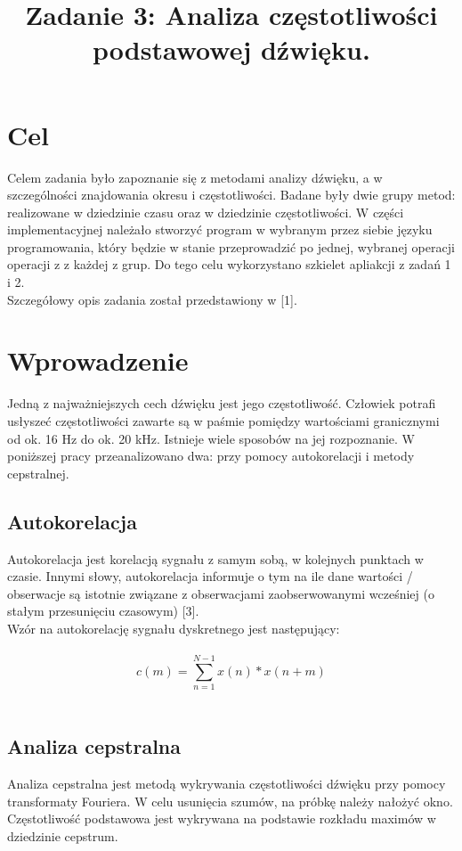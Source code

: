 \documentclass{classrep}
\author{
  \studentinfo{Jakub Antosik}{206788} \and
  \studentinfo{Andrzej Lisowski}{206807} 
}
\title{Zadanie 3: Analiza częstotliwości podstawowej dźwięku.}
\begin{document}
\maketitle

\section{Cel}
Celem zadania było zapoznanie się z metodami analizy dźwięku, a w szczególności znajdowania okresu i częstotliwości. Badane były dwie grupy metod: realizowane w dziedzinie czasu oraz w dziedzinie częstotliwości. W części implementacyjnej należało stworzyć program w wybranym przez siebie języku programowania, który będzie w stanie przeprowadzić po jednej, wybranej operacji operacji z z każdej z grup. Do tego celu wykorzystano szkielet apliakcji z zadań 1 i 2.\\
\indent
Szczegółowy opis zadania został przedstawiony w [1].

\section{Wprowadzenie}
Jedną z najważniejszych cech dźwięku jest jego częstotliwość. Człowiek potrafi usłyszeć częstotliwości zawarte są w paśmie pomiędzy wartościami granicznymi od ok. 16 Hz do ok. 20 kHz. Istnieje wiele sposobów na jej rozpoznanie. W poniższej pracy przeanalizowano dwa: przy pomocy autokorelacji i metody cepstralnej.
 
\subsection{Autokorelacja}
Autokorelacja jest korelacją sygnału z samym sobą, w kolejnych punktach w czasie. Innymi słowy, autokorelacja informuje o tym na ile dane wartości / obserwacje są istotnie związane z obserwacjami zaobserwowanymi wcześniej (o stałym przesunięciu czasowym) [3].\\
\indent
Wzór na autokorelację sygnału dyskretnego jest następujący:\\
\\
\[ c(m) = \sum_{n = 1}^{N - 1} x(n) \ast x(n + m) \]
\\

\subsection{Analiza cepstralna}
Analiza cepstralna jest metodą wykrywania częstotliwości dźwięku przy pomocy transformaty Fouriera. W celu usunięcia szumów, na próbkę należy nałożyć okno. Częstotliwość podstawowa jest wykrywana na podstawie rozkładu maximów w dziedzinie cepstrum.  
\end{document}
